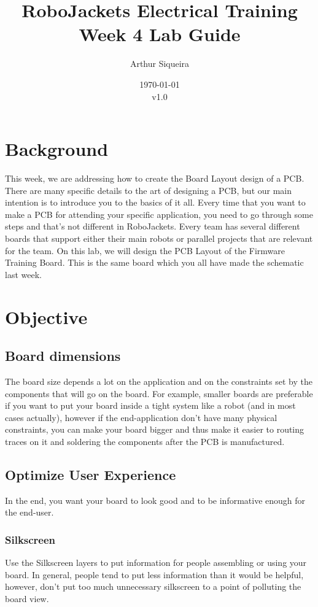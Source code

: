 \documentclass{article}
\title{RoboJackets Electrical Training Week 4 Lab Guide}
\author{Arthur Siqueira}
\date{\today\\v1.0}
\begin{document}
\maketitle{}
\setcounter{tocdepth}{2}
\tableofcontents
\pagebreak


\section{Background}
This week, we are addressing how to create the Board Layout design of a PCB. There are many specific details to the art of designing a PCB, but our main intention is to introduce you to the basics of it all. Every time that you want to make a PCB for attending your specific application, you need to go through some steps and that's not different in RoboJackets. Every team has several different boards that support either their main robots or parallel projects that are relevant for the team. On this lab, we will design the PCB Layout of the Firmware Training Board. This is the same board which you all have made the schematic last week.

\section{Objective}
\subsection{Board dimensions}
The board size depends a lot on the application and on the constraints set by the components that will go on the board. For example, smaller boards are preferable if you want to put your board inside a tight system like a robot (and in most cases actually), however if the end-application don't have many physical constraints, you can make your board bigger and thus make it easier to routing traces on it and soldering the components after the PCB is manufactured.

\subsection{Optimize User Experience}
In the end, you want your board to look good and to be informative enough for the end-user.
\subsubsection{Silkscreen}
Use the Silkscreen layers to put information for people assembling or using your board. In general, people tend to put less information than it would be helpful, however, don't put too much unnecessary silkscreen to a point of polluting the board view.
\end{document}
